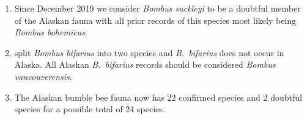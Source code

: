 \begin{center}
{\begin{enumerate}
\item Since December 2019 we consider \textit{Bombus suckleyi} to be a doubtful member of the Alaskan fauna with all prior records of this species most likely being \textit{Bombus bohemicus}. 

\item \citet{Ghisbainetal2020} split \textit{Bombus bifarius} into two species and \textit{B.\ bifarius} does not occur in Alaska. All Alaskan \textit{B.\ bifarius} records should be considered \textit{Bombus vancouverensis}.

\item The Alaskan bumble bee fauna now has 22 confirmed species and 2 doubtful species for a possible total of 24 species.

\end{enumerate}
 }
\end{center}

\vspace{4mm}

